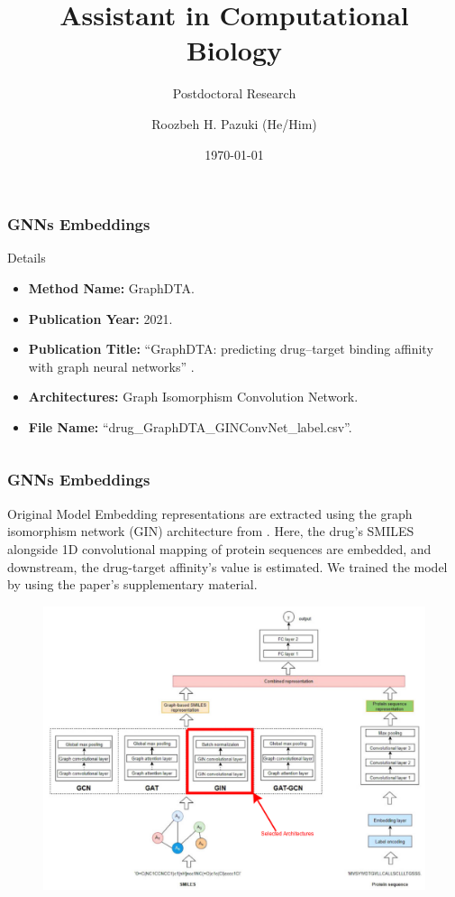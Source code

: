 \documentclass[usenames,dvipsnames]{beamer}
\title{Assistant in Computational Biology}
\subtitle{Postdoctoral Research}
\author{Roozbeh H. Pazuki (He/Him)}
\date{\today}
\begin{document}

\begin{frame}
 \frametitle{GNNs Embeddings}
\begin{block}{Details}
	\begin{itemize}
		\item \textbf{Method Name:} GraphDTA.
		\item \textbf{Publication Year:} 2021.
		\item \textbf{Publication Title:} ``GraphDTA: predicting drug–target binding affinity with  graph neural networks'' \cite{btaa921}.
		\item \textbf{Architectures:} Graph Isomorphism Convolution Network.
		\item \textbf{File Name:} ``drug\_GraphDTA\_GINConvNet\_label.csv''.
	\end{itemize}
\end{block}
\begin{columns}[b]
 \centering
		

 \centering
 \end{columns} 
\end{frame}


\begin{frame}
	\frametitle{GNNs Embeddings}
	\begin{block}{Original Model}
	Embedding representations are extracted using the graph isomorphism network (GIN) architecture from \cite{btaa921}. Here, the drug's SMILES alongside 1D convolutional mapping of protein sequences are embedded, and downstream, the drug-target affinity's value is estimated. We trained the model by using the paper's supplementary material.
	\end{block}

	\begin{figure}
		\includegraphics[width=.7\textwidth]{train_workflow}
	\end{figure}
\end{frame}
\end{document}
